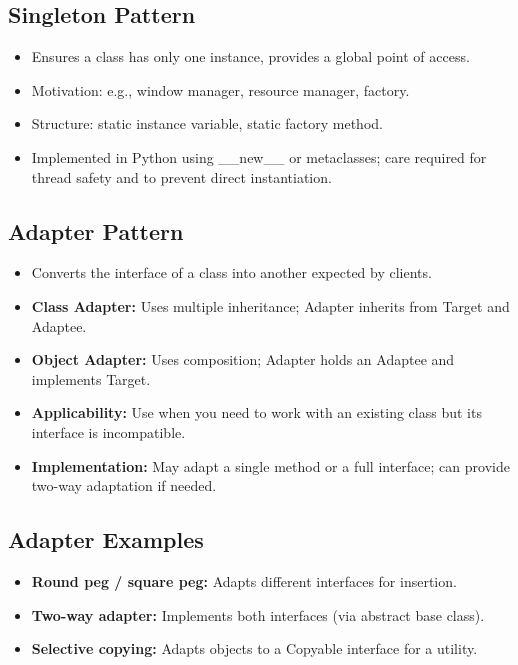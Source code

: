 \documentclass[11pt,a4paper]{article}
\begin{document}
\subsection*{Singleton Pattern}
\begin{itemize}
    \item Ensures a class has only one instance, provides a global point of access.
    \item Motivation: e.g., window manager, resource manager, factory.
    \item Structure: static instance variable, static factory method.
    \item Implemented in Python using \_\_new\_\_ or metaclasses; care required for thread safety and to prevent direct instantiation.
\end{itemize}

\subsection*{Adapter Pattern}
\begin{itemize}
    \item Converts the interface of a class into another expected by clients.
    \item \textbf{Class Adapter:} Uses multiple inheritance; Adapter inherits from Target and Adaptee.
    \item \textbf{Object Adapter:} Uses composition; Adapter holds an Adaptee and implements Target.
    \item \textbf{Applicability:} Use when you need to work with an existing class but its interface is incompatible.
    \item \textbf{Implementation:} May adapt a single method or a full interface; can provide two-way adaptation if needed.
\end{itemize}

\subsection*{Adapter Examples}
\begin{itemize}
    \item \textbf{Round peg / square peg:} Adapts different interfaces for insertion.
    \item \textbf{Two-way adapter:} Implements both interfaces (via abstract base class).
    \item \textbf{Selective copying:} Adapts objects to a Copyable interface for a utility.
\end{itemize}
\end{document}
